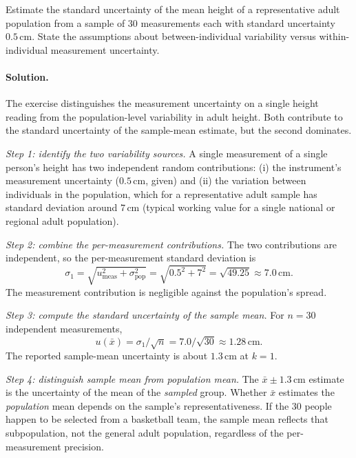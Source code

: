 \begin{exercise}
Estimate the standard uncertainty of the mean height of a
representative adult population from a sample of $30$ measurements
each with standard uncertainty $0.5 \,\si{\centi\meter}$. State
the assumptions about between-individual variability versus
within-individual measurement uncertainty.
\end{exercise}

\paragraph{Solution.}
The exercise distinguishes the measurement uncertainty on a single
height reading from the population-level variability in adult
height. Both contribute to the standard uncertainty of the
sample-mean estimate, but the second dominates.

\emph{Step 1: identify the two variability sources.} A single
measurement of a single person's height has two independent
random contributions: (i) the instrument's measurement uncertainty
($0.5\,\si{\centi\meter}$, given) and (ii) the variation between
individuals in the population, which for a representative adult
sample has standard deviation around $7\,\si{\centi\meter}$ (typical
working value for a single national or regional adult population).

\emph{Step 2: combine the per-measurement contributions.} The two
contributions are independent, so the per-measurement standard
deviation is
\[
\sigma_{1} = \sqrt{u_{\text{meas}}^{2} + \sigma_{\text{pop}}^{2}} =
\sqrt{0.5^{2} + 7^{2}} = \sqrt{49.25} \approx 7.0\,\si{\centi
\meter}.
\]
The measurement contribution is negligible against the
population's spread.

\emph{Step 3: compute the standard uncertainty of the sample
mean.} For $n = 30$ independent measurements,
\[
u(\bar{x}) = \sigma_{1}/\sqrt{n} = 7.0/\sqrt{30} \approx 1.28\,
\si{\centi\meter}.
\]
The reported sample-mean uncertainty is about $1.3\,\si{\centi
\meter}$ at $k = 1$.

\emph{Step 4: distinguish sample mean from population mean.} The
$\bar{x} \pm 1.3\,\si{\centi\meter}$ estimate is the uncertainty
of the mean of the \emph{sampled} group. Whether $\bar{x}$
estimates the \emph{population} mean depends on the sample's
representativeness. If the $30$ people happen to be selected from
a basketball team, the sample mean reflects that subpopulation,
not the general adult population, regardless of the per-measurement
precision.

